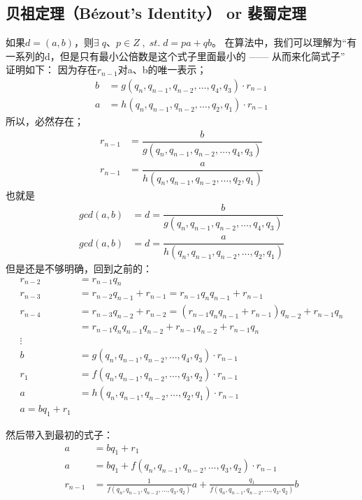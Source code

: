 \documentclass[12pt]{article}
\begin{document}
\subsection{贝祖定理（Bézout's Identity） or 裴蜀定理}
如果$d = (a,b)$，则$\exists\;q、p\in Z \;,\;st.\;d=pa+qb$。
在算法中，我们可以理解为“有一系列的d，但是只有最小公倍数是这个式子里面最小的 —— 从而来化简式子”
证明如下：
因为存在$r_{n-1}$对a、b的唯一表示；
\begin{align}
    b &= g(q_{n},q_{n-1},q_{n-2},\dots,q_{4},q_{3})\cdot r_{n-1}\\
    a &= h(q_{n},q_{n-1},q_{n-2},\dots,q_{2},q_{1})\cdot r_{n-1}
\end{align}
所以，必然存在；
\begin{align}
    r_{n-1} &= \dfrac{b}{g(q_{n},q_{n-1},q_{n-2},\dots,q_{4},q_{3})}\\
    r_{n-1} &= \dfrac{a}{h(q_{n},q_{n-1},q_{n-2},\dots,q_{2},q_{1})}
\end{align}
也就是
\begin{align}
    gcd(a,b) &= d = \dfrac{b}{g(q_{n},q_{n-1},q_{n-2},\dots,q_{4},q_{3})}\\
    gcd(a,b) &= d = \dfrac{a}{h(q_{n},q_{n-1},q_{n-2},\dots,q_{2},q_{1})}
\end{align}
但是还是不够明确，回到之前的：
\begin{align}
    r_{n-2} &= r_{n-1}q_{n}\\
    r_{n-3} &= r_{n-2}q_{n-1}+r_{n-1}=r_{n-1}q_{n}q_{n-1}+r_{n-1}\\
    r_{n-4} &= r_{n-3}q_{n-2}+r_{n-2}=(r_{n-1}q_{n}q_{n-1}+r_{n-1})q_{n-2}+r_{n-1}q_{n}\\ \nonumber
            &=r_{n-1}q_{n}q_{n-1}q_{n-2}+r_{n-1}q_{n-2}+r_{n-1}q_{n}\\
    \vdots\nonumber\\
    b &= g(q_{n},q_{n-1},q_{n-2},\dots,q_{4},q_{3})\cdot r_{n-1}\\
    r_{1} &= f(q_{n},q_{n-1},q_{n-2},\dots,q_{3},q_{2})\cdot r_{n-1}\\
    a &= h(q_{n},q_{n-1},q_{n-2},\dots,q_{2},q_{1})\cdot r_{n-1}\\
    a=bq_{1}+r_{1}
\end{align}

然后带入到最初的式子：
\begin{align}
    a&=bq_{1}+r_{1}\\
    a&=bq_{1}+f(q_{n},q_{n-1},q_{n-2},\dots,q_{3},q_{2})\cdot r_{n-1}\\
    r_{n-1}&=\frac{1}{f(q_{n},q_{n-1},q_{n-2},\dots,q_{3},q_{2})}a+\frac{q_{1}}{f(q_{n},q_{n-1},q_{n-2},\dots,q_{3},q_{2})}b
\end{align}
\end{document}

